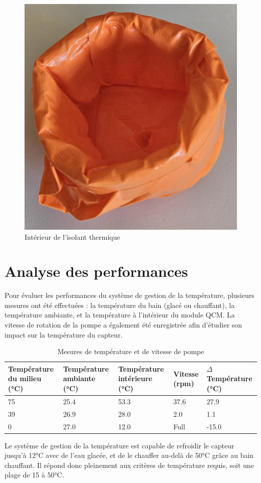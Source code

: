 \begin{figure}[H]
\begin{minipage}{0.48\textwidth}
        \includegraphics[width=\textwidth]{assets/figures/Interieur_Isolant.jpg}
        \caption{Intérieur de l'isolant thermique}
        \label{fig:Interieur_Isolant}
    \end{minipage}
\end{figure}

\section{Analyse des performances}

Pour évaluer les performances du système de gestion de la température, plusieurs mesures ont été effectuées :  
la température du bain (glacé ou chauffant), la température ambiante, et la température à l’intérieur du module QCM.  
La vitesse de rotation de la pompe a également été enregistrée afin d’étudier son impact sur la température du capteur.

\begin{table}[h!]
\centering
\begin{tabularx}{\textwidth}{|X|X|X|X|X|}
\hline
\textbf{Température du milieu (°C)} & \textbf{Température ambiante (°C)} & \textbf{Température intérieure (°C)} & \textbf{Vitesse (rpm)} & \textbf{$\Delta$ Température (°C)} \\
\hline
75 & 25.4 & 53.3 & 37.6 & 27.9 \\
39 & 26.9 & 28.0 & 2.0 & 1.1  \\
0  & 27.0 & 12.0 & Full & -15.0 \\
\hline
\end{tabularx}
\caption{Mesures de température et de vitesse de pompe}
\end{table}

Le système de gestion de la température est capable de refroidir le capteur jusqu’à 12°C avec de l’eau glacée, et de le chauffer au-delà de 50°C grâce au bain chauffant.  
Il répond donc pleinement aux critères de température requis, soit une plage de 15 à 50°C.